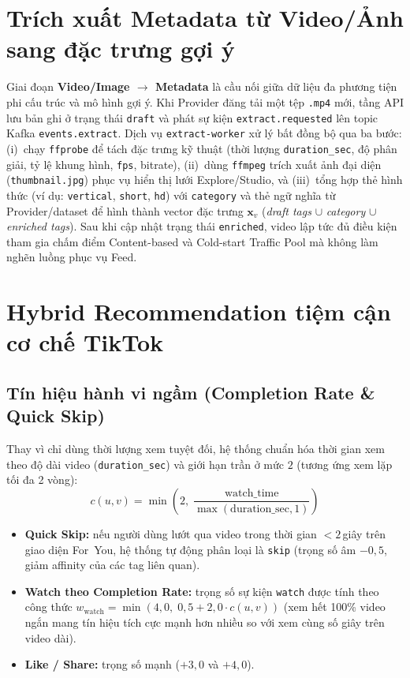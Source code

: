 \section{Trích xuất Metadata từ Video/Ảnh sang đặc trưng gợi ý}

Giai đoạn \textbf{Video/Image $\rightarrow$ Metadata} là cầu nối giữa dữ liệu đa phương tiện phi cấu trúc và mô hình gợi ý. Khi Provider đăng tải một tệp \texttt{.mp4} mới, tầng API lưu bản ghi ở trạng thái \texttt{draft} và phát sự kiện \texttt{extract.requested} lên topic Kafka \texttt{events.extract}. Dịch vụ \texttt{extract-worker} xử lý bất đồng bộ qua ba bước: (i)~chạy \texttt{ffprobe} để tách đặc trưng kỹ thuật (thời lượng \texttt{duration\_sec}, độ phân giải, tỷ lệ khung hình, \texttt{fps}, bitrate), (ii)~dùng \texttt{ffmpeg} trích xuất ảnh đại diện (\texttt{thumbnail.jpg}) phục vụ hiển thị lưới Explore/Studio, và (iii)~tổng hợp thẻ hình thức (ví dụ: \texttt{vertical}, \texttt{short}, \texttt{hd}) với \texttt{category} và thẻ ngữ nghĩa từ Provider/dataset để hình thành vector đặc trưng $\mathbf{x}_v$ (\textit{draft tags} $\cup$ \textit{category} $\cup$ \textit{enriched tags}). Sau khi cập nhật trạng thái \texttt{enriched}, video lập tức đủ điều kiện tham gia chấm điểm Content-based và Cold-start Traffic Pool mà không làm nghẽn luồng phục vụ Feed.

\section{Hybrid Recommendation tiệm cận cơ chế TikTok}

\subsection{Tín hiệu hành vi ngầm (Completion Rate \& Quick Skip)}

Thay vì chỉ dùng thời lượng xem tuyệt đối, hệ thống chuẩn hóa thời gian xem theo độ dài video (\texttt{duration\_sec}) và giới hạn trần ở mức $2$ (tương ứng xem lặp tối đa 2 vòng):
\begin{equation}
  c(u,v) = \min\!\left(2,\; \frac{\text{watch\_time}}{\max(\text{duration\_sec}, 1)}\right)
\end{equation}
\begin{itemize}
  \item \textbf{Quick Skip:} nếu người dùng lướt qua video trong thời gian $< 2$\,giây trên giao diện For~You, hệ thống tự động phân loại là \texttt{skip} (trọng số âm $-0{,}5$, giảm affinity của các tag liên quan).
  \item \textbf{Watch theo Completion Rate:} trọng số sự kiện \texttt{watch} được tính theo công thức $w_{\mathrm{watch}} = \min(4{,}0,\; 0{,}5 + 2{,}0\cdot c(u,v))$ (xem hết 100\% video ngắn mang tín hiệu tích cực mạnh hơn nhiều so với xem cùng số giây trên video dài).
  \item \textbf{Like / Share:} trọng số mạnh ($+3{,}0$ và $+4{,}0$).
\end{itemize}

